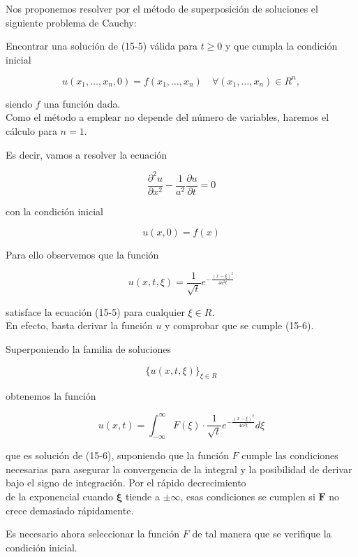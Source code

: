 \documentclass[10pt]{article}
\theoremstyle{plain}
\theoremstyle{definition}
\theoremstyle{remark}
\begin{document}
Nos proponemos resolver por el método de superposición de soluciones el siguiente problema de Cauchy:

Encontrar una solución de (15-5) válida para $t \geqslant 0$ y que cumpla la condición inicial

$$
u\left(x_{1}, \ldots, x_{n}, 0\right)=f\left(x_{1}, \ldots, x_{n}\right) \quad \forall\left(x_{1}, \ldots, x_{n}\right) \in R^{n},
$$

siendo $f$ una función dada.\\
Como el método a emplear no depende del número de variables, haremos el cálculo para $n=1$.

Es decir, vamos a resolver la ecuación


\begin{equation*}
\frac{\partial^{2} u}{\partial x^{2}}-\frac{1}{a^{2}} \frac{\partial u}{\partial t}=0 \tag{$15\cdot6$}
\end{equation*}


con la condición inicial

$$
u(x, 0)=f(x)
$$

Para ello observemos que la función


\begin{equation*}
u(x, t, \xi)=\frac{1}{\sqrt{t}} e^{-\frac{(x-\xi)^{2}}{4 a^{2} t}} \tag{15-7}
\end{equation*}


satisface la ecuación (15-5) para cualquier $\xi \in R$.\\
En efecto, basta derivar la función $u$ y comprobar que se cumple (15-6).

Superponiendo la familia de soluciones

$$
\{u(x, t, \xi)\}_{\xi \in R}
$$

obtenemos la función


\begin{equation*}
u(x, t)=\int_{-\infty}^{\infty} F(\xi) \cdot \frac{1}{\sqrt{t}} e^{-\frac{(x-\xi)^{2}}{4 a^{2} t}} d \xi \tag{15-8}
\end{equation*}


que es solución de (15-6), suponiendo que la función $F$ cumple las condiciones necesarias para asegurar la convergencia de la integral y la posibilidad de derivar bajo el signo de integración. Por el rápido decrecimiento\\
de la exponencial cuando $\boldsymbol{\xi}$ tiende a $\pm \infty$, esas condiciones se cumplen si $\boldsymbol{F}$ no crece demasiado rápidamente.

Es necesario ahora seleccionar la función $F$ de tal manera que se verifique la condición inicial.
\end{document}
